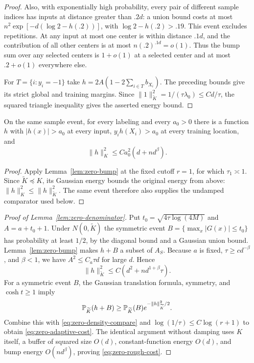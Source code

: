 \begin{proof}
Also, with exponentially high probability, every pair of different sample indices has inputs at distance greater than $.2d$: a union bound costs at most $n^2\exp[-d(\log2-h(.2))]$, with $\log2-h(.2)>.19$. This event excludes repetitions. At any input at most one center is within distance $.1d$, and the contribution of all other centers is at most $n(.2)^{.1d}=o(1)$. Thus the bump sum over any selected centers is $1+o(1)$ at a selected center and at most $.2+o(1)$ everywhere else.

For $T=\{i:y_i=-1\}$ take $h=2A(1-2\sum_{i\in T}b_{X_i})$. The preceding bounds give its strict global and training margins. Since $\|1\|_{\widetilde K}^2=1/(\tau\lambda_0)\le Cd/\tau$, the squared triangle inequality gives the asserted energy bound.
\end{proof}

\begin{corollary}\label{lem:comparator}
On the same sample event, for every labeling and every $a_0>0$ there
is a function $h$ with $|h(x)|>a_0$ at every input,
$y_i h(X_i)>a_0$ at every training location, and
\[
 \|h\|_K^2\le C a_0^2(d+nd^\beta).
\]
\end{corollary}
\begin{proof}
Apply Lemma~\ref{lem:zero-bump} at the fixed cutoff $r=1$, for which
$\tau_1\asymp1$. Since $\widetilde K\preceq K$, its Gaussian energy
bounds the original energy from above:
$\|h\|_K^2\le\|h\|_{\widetilde K}^2$. The same event therefore also
supplies the undamped comparator used below.
\end{proof}

\begin{proof}[Proof of Lemma~\ref{lem:zero-denominator}]
Put $t_0=\sqrt{4\tau\log(4M)}$ and $A=a+t_0+1$. Under $N(0,\widetilde K)$ the symmetric event $B=\{\max_x|G(x)|\le t_0\}$ has probability at least $1/2$, by the diagonal bound and a Gaussian union bound. Lemma~\ref{lem:zero-bump} makes $h+B$ a subset of $A_S$. Because $a$ is fixed, $\tau\ge c d^{-\beta}$, and $\beta<1$, we have $A^2\le C_a\tau d$ for large $d$. Hence
\[
 \|h\|_{\widetilde K}^2\le C(d^2+n d^{1+\beta}\tau).
\]
For a symmetric event $B$, the Gaussian translation formula, symmetry, and $\cosh t\ge1$ imply
\[
 \mathbb P_{\widetilde K}(h+B)\ge \mathbb P_{\widetilde K}(B)e^{-\|h\|_{\widetilde K}^2/2}.
\]
Combine this with \eqref{eq:zero-density-compare} and
$\log(1/\tau)\le C\log(r+1)$ to obtain
\eqref{eq:zero-adaptive-cost}. The identical argument without damping
uses $K$ itself, a buffer of squared size $O(d)$, constant-function
energy $O(d)$, and bump energy $O(nd^\beta)$, proving
\eqref{eq:zero-rough-cost}.
\end{proof}


